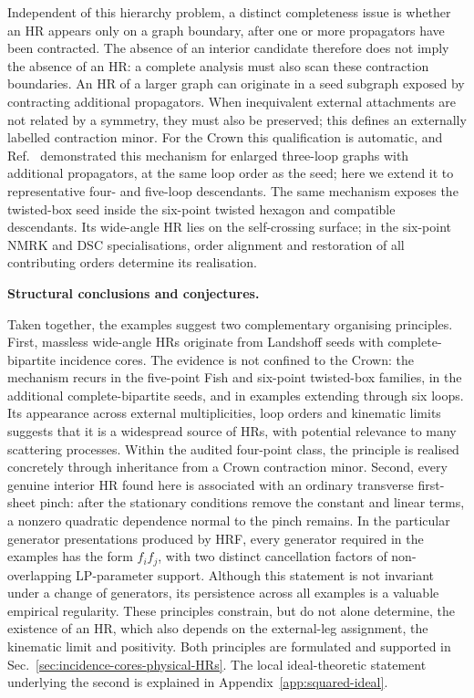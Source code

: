 \documentclass[a4paper,11pt]{article}
\begin{document}
Independent of this hierarchy problem, a distinct completeness issue is
whether an HR appears only on a graph boundary, after one or more propagators
have been contracted.  The absence of an interior candidate therefore does
not imply the absence of an HR: a complete analysis must also scan these
contraction boundaries.  An HR of a larger graph can originate in a seed
subgraph exposed by contracting additional propagators.  When inequivalent
external attachments are not related by a symmetry, they must also be
preserved; this defines an externally labelled contraction minor.  For the
Crown this qualification is automatic, and
Ref.~\cite{Gardi:2024axt} demonstrated this mechanism for enlarged three-loop
graphs with additional propagators, at the same loop order as the seed; here
we extend it to representative four- and five-loop descendants.  The same
mechanism exposes the twisted-box seed inside the six-point twisted hexagon
and compatible descendants.  Its wide-angle HR lies on the self-crossing
surface; in the six-point NMRK and DSC specialisations, order alignment and
restoration of all contributing orders determine its realisation.

\medskip
\noindent\textbf{Structural conclusions and conjectures.}\par\nopagebreak\smallskip\nopagebreak

Taken together, the examples suggest two complementary organising principles.
First, massless wide-angle HRs originate from Landshoff seeds with
complete-bipartite incidence cores.  The evidence is not confined to the
Crown: the mechanism recurs in the five-point Fish and six-point twisted-box
families, in the additional complete-bipartite seeds, and in examples extending
through six loops.  Its appearance across external multiplicities, loop orders
and kinematic limits suggests that it is a widespread source of HRs, with
potential relevance to many scattering processes.  Within the audited
four-point class, the principle is realised concretely through inheritance from
a Crown contraction minor.  Second, every genuine interior HR found
here is associated with an ordinary transverse first-sheet pinch: after the
stationary conditions remove the constant and linear terms, a nonzero
quadratic dependence normal to the pinch remains.  In the particular generator
presentations produced by HRF, every generator required in the examples has
the form \(f_i f_j\), with two distinct cancellation factors of non-overlapping
LP-parameter support.  Although this statement is not invariant under a change
of generators, its persistence across all examples is a valuable empirical
regularity.  These principles constrain, but do not alone determine, the
existence of an HR, which also depends on the external-leg assignment, the
kinematic limit and positivity.  Both principles are formulated and supported
in Sec.~\ref{sec:incidence-cores-physical-HRs}.  The local ideal-theoretic
statement underlying the second is explained in
Appendix~\ref{app:squared-ideal}.
\end{document}
